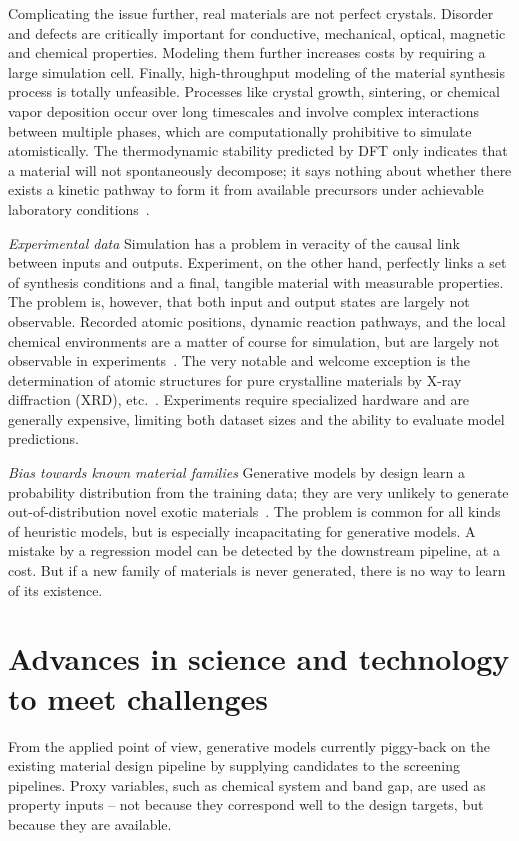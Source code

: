 \documentclass{iopjournal}
\begin{document}
Complicating the issue further, real materials are not perfect crystals. Disorder and defects are critically important for conductive, mechanical, optical, magnetic and chemical properties. Modeling them further increases costs by requiring a large simulation cell. Finally, high-throughput modeling of the material synthesis process is totally unfeasible. Processes like crystal growth, sintering, or chemical vapor deposition occur over long timescales and involve complex interactions between multiple phases, which are computationally prohibitive to simulate atomistically. The thermodynamic stability predicted by DFT only indicates that a material will not spontaneously decompose; it says nothing about whether there exists a kinetic pathway to form it from available precursors under achievable laboratory conditions~\cite{kim2025explainable}.

\textit{Experimental data} Simulation has a problem in veracity of the causal link between inputs and outputs. Experiment, on the other hand, perfectly links a set of synthesis conditions and a final, tangible material with measurable properties. The problem is, however, that both input and output states are largely not observable. Recorded atomic positions, dynamic reaction pathways, and the local chemical environments are a matter of course for simulation, but are largely not observable in experiments~\cite{vasudevan2019materials}. The very notable and welcome exception is the determination of atomic structures for pure crystalline materials by X-ray diffraction (XRD), etc.~\cite{zagorac2019recent}. Experiments require specialized hardware and are generally expensive, limiting both dataset sizes and the ability to evaluate model predictions.

\textit{Bias towards known material families} Generative models by design learn a probability distribution from the training data; they are very unlikely to generate out-of-distribution novel exotic materials~\cite{handoko2025artificialintelligencegenerativemodels}. The problem is common for all kinds of heuristic models, but is especially incapacitating for generative models. A mistake by a regression model can be detected by the downstream pipeline, at a cost. But if a new family of materials is never generated, there is no way to learn of its existence.

\section*{Advances in science and technology to meet challenges}
From the applied point of view, generative models currently piggy-back on the existing material design pipeline by supplying candidates to the screening pipelines. Proxy variables, such as chemical system and band gap, are used as property inputs -- not because they correspond well to the design targets, but because they are available.
\end{document}
